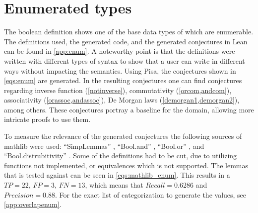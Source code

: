 \section{Enumerated types}\label{sec:result:enum}
The boolean definition shows one of the base data types of which are enumerable.
The definitions used, the generated code, and the generated conjectures in Lean can be found in \cref{app:enum}.
A noteworthy point is that the definitions were written with different types of syntax to show that a user can write in different ways without impacting the semantics.
Using Pisa, the conjectures shown in \cref{eqs:enum} are generated.
In the resulting conjectures one can find conjectures regarding inverse function (\cref{notinverse}), commutativity (\cref{orcom,andcom}), associativity (\cref{orassoc,andassoc}), De Morgan laws (\cref{demorgan1,demorgan2}), among others.
These conjectures portray a baseline for the domain, allowing more intricate proofs to use them.

To measure the relevance of the generated conjectures the following sources of mathlib were used: ``SimpLemmas'' \autocite{SimpLemmas},  ``Bool.and'' \autocite{Bool.And}, ``Bool.or'' \autocite{Bool.Or}, and ``Bool.distrubitivity'' \autocite{Bool.Dist}.
Some of the definitions had to be cut, due to utilizing functions not implemented, or equivalences which is not supported.
The lemmas that is tested against can be seen in \cref{eqs:mathlib_enum}.
This results in a $TP = 22$, $FP = 3$, $FN = 13$, which means that $Recall = 0.6286$ and $Precision = 0.88$.
For the exact list of categorization to generate the values, see \cref{app:overlapenum}.

\newpage

